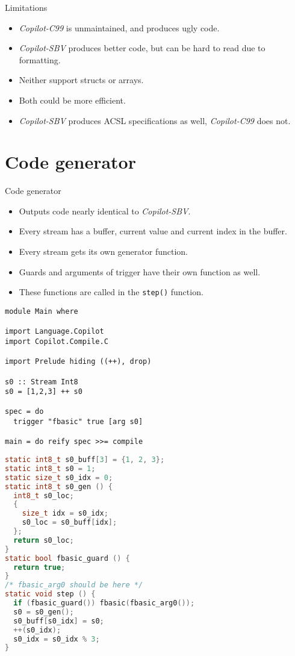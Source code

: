 \documentclass{beamer}
\begin{document}
\begin{frame}{Limitations}
\begin{itemize}
  \item \emph{Copilot-C99} is unmaintained, and produces ugly code.
  \item \emph{Copilot-SBV} produces better code, but can be hard to read due to
  formatting.
  \item Neither support structs or arrays.
  \item Both could be more efficient.
  \item \emph{Copilot-SBV} produces ACSL specifications as well,
  \emph{Copilot-C99} does not.
\end{itemize}
\end{frame}



\section{Code generator}
\begin{frame}{Code generator}
\begin{itemize}
  \item Outputs code nearly identical to \emph{Copilot-SBV}.
  \item Every stream has a buffer, current value and current index in the buffer.
  \item Every stream gets its own generator function.
  \item Guards and arguments of trigger have their own function as well.
  \item These functions are called in the \texttt{step()} function.
\end{itemize}
\end{frame}

\begin{frame}[fragile]
\begin{lstlisting}
module Main where

import Language.Copilot
import Copilot.Compile.C

import Prelude hiding ((++), drop)

s0 :: Stream Int8
s0 = [1,2,3] ++ s0

spec = do
  trigger "fbasic" true [arg s0]

main = do reify spec >>= compile
\end{lstlisting}
\end{frame}


\begin{frame}[fragile]
\begin{lstlisting}[basicstyle=\small, language=c]
static int8_t s0_buff[3] = {1, 2, 3};
static int8_t s0 = 1;
static size_t s0_idx = 0;
static int8_t s0_gen () {
  int8_t s0_loc;
  {
    size_t idx = s0_idx;
    s0_loc = s0_buff[idx];
  };
  return s0_loc;
}
static bool fbasic_guard () {
  return true;
}
/* fbasic_arg0 should be here */
static void step () {
  if (fbasic_guard()) fbasic(fbasic_arg0());
  s0 = s0_gen();
  s0_buff[s0_idx] = s0;
  ++(s0_idx);
  s0_idx = s0_idx % 3;
}
\end{lstlisting}
\end{frame}
\end{document}

